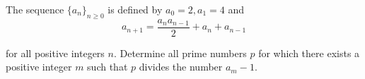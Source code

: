 The sequence $ \{ a_n \} _ { n \ge 0 } $ is defined by $ a_0 = 2 , a_1 = 4 $ and\[ a_{n+1} = \frac{a_n a_{n-1}}{2} + a_n + a_{n-1} \]

for all positive integers $ n $. Determine all prime numbers $ p $ for which there exists a positive integer $ m $ such that $ p $ divides the number $ a_m - 1 $.